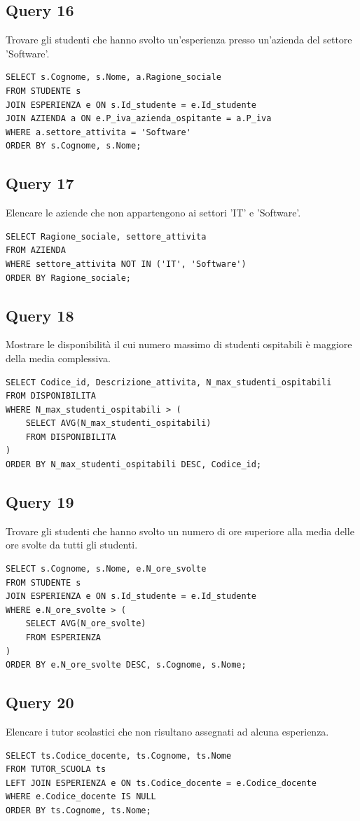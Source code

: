 \documentclass[a4paper,12pt]{article}
\begin{document}
\subsection*{Query 16}Trovare gli studenti che hanno svolto un'esperienza presso un'azienda del settore 'Software'.
\begin{lstlisting}
SELECT s.Cognome, s.Nome, a.Ragione_sociale
FROM STUDENTE s
JOIN ESPERIENZA e ON s.Id_studente = e.Id_studente
JOIN AZIENDA a ON e.P_iva_azienda_ospitante = a.P_iva
WHERE a.settore_attivita = 'Software'
ORDER BY s.Cognome, s.Nome;
\end{lstlisting}
\subsection*{Query 17}Elencare le aziende che non appartengono ai settori 'IT' e 'Software'.
\begin{lstlisting}
SELECT Ragione_sociale, settore_attivita
FROM AZIENDA
WHERE settore_attivita NOT IN ('IT', 'Software')
ORDER BY Ragione_sociale;
\end{lstlisting}
\subsection*{Query 18}Mostrare le disponibilità il cui numero massimo di studenti ospitabili è maggiore della media complessiva.
\begin{lstlisting}
SELECT Codice_id, Descrizione_attivita, N_max_studenti_ospitabili
FROM DISPONIBILITA
WHERE N_max_studenti_ospitabili > (
    SELECT AVG(N_max_studenti_ospitabili)
    FROM DISPONIBILITA
)
ORDER BY N_max_studenti_ospitabili DESC, Codice_id;
\end{lstlisting}
\subsection*{Query 19}Trovare gli studenti che hanno svolto un numero di ore superiore alla media delle ore svolte da tutti gli studenti.
\begin{lstlisting}
SELECT s.Cognome, s.Nome, e.N_ore_svolte
FROM STUDENTE s
JOIN ESPERIENZA e ON s.Id_studente = e.Id_studente
WHERE e.N_ore_svolte > (
    SELECT AVG(N_ore_svolte)
    FROM ESPERIENZA
)
ORDER BY e.N_ore_svolte DESC, s.Cognome, s.Nome;
\end{lstlisting}
\subsection*{Query 20}Elencare i tutor scolastici che non risultano assegnati ad alcuna esperienza.
\begin{lstlisting}
SELECT ts.Codice_docente, ts.Cognome, ts.Nome
FROM TUTOR_SCUOLA ts
LEFT JOIN ESPERIENZA e ON ts.Codice_docente = e.Codice_docente
WHERE e.Codice_docente IS NULL
ORDER BY ts.Cognome, ts.Nome;
\end{lstlisting}
\end{document}
